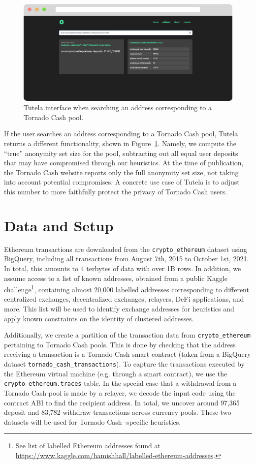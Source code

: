 \documentclass[11pt,a4paper]{article}
\begin{document}
\begin{figure}[h!]
\includegraphics[width=\linewidth]{figures/demo2.pdf}
\caption{Tutela interface when searching an address corresponding to a Tornado Cash pool.}
\label{fig:demo2}
\end{figure}

If the user searches an address corresponding to a Tornado Cash pool, Tutela returns a different functionality, shown in Figure~\ref{fig:demo2}. Namely, we compute the ``true'' anonymity set size for the pool, subtracting out all equal user deposits that may have compromised through our heuristics. At the time of publication, the Tornado Cash website reports only the full anonymity set size, not taking into account potential compromises. A concrete use case of Tutela is to adjust this number to more faithfully protect the privacy of Tornado Cash users.

\section{Data and Setup}

Ethereum transactions are downloaded from the \texttt{crypto\_ethereum} dataset using BigQuery, including all transactions from August 7th, 2015 to October 1st, 2021.  In total, this amounts to 4 terbytes of data with over 1B rows.
In addition, we assume access to a list of known addresses, obtained from a public Kaggle challenge\footnote{See list of labelled Ethereum addresses found at \url{https://www.kaggle.com/hamishhall/labelled-ethereum-addresses}.}, containing almost 20,000 labelled addresses corresponding to different centralized exchanges, decentralized exchanges, relayers, DeFi applications, and more.
This list will be used to identify exchange addresses for heuristics and apply known constraints on the identity of clustered addresses.

Additionally, we create a partition of the transaction data from \texttt{crypto\_ethereum} pertaining to Tornado Cash pools. This is done by checking that the address receiving a transaction is a Tornado Cash smart contract (taken from a BigQuery dataset \texttt{tornado\_cash\_transactions}). To capture the transactions executed by the Ethereum virtual machine (e.g. through a smart contract), we use the \texttt{crypto\_ethereum.traces} table. In the special case that a withdrawal from a Tornado Cash pool is made by a relayer, we decode the input code using the contract ABI to find the recipient address. In total, we uncover around 97,365 deposit and 83,782 withdraw transactions across currency pools. These two datasets will be used for Tornado Cash -specific heuristics.
\end{document}
